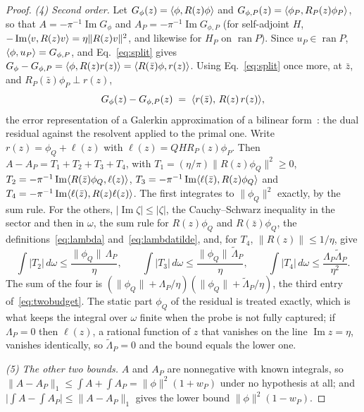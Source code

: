 \begin{proof}
\emph{(4) Second order.} Let $G_\phi(z)=\langle \phi,R(z)\phi \rangle$ and $G_{\phi,P}(z)=\langle \phi_P,R_P(z)\phi_P \rangle$,
so that $A=-\pi^{-1}\operatorname{Im}G_\phi$ and $A_P=-\pi^{-1}\operatorname{Im}G_{\phi,P}$ (for self-adjoint $H$,
$-\operatorname{Im}\langle v,R(z)v \rangle=\eta\lVert R(z)v\rVert^{2}$, and likewise for $H_P$ on $\operatorname{ran}P$).
Since $u_P\in\operatorname{ran}P$, $\langle \phi,u_P \rangle=G_{\phi,P}$, and Eq.~\eqref{eq:split} gives
$G_\phi-G_{\phi,P}=\langle \phi,R(z)r(z) \rangle=\langle R(\bar z)\phi,r(z) \rangle$. Using Eq.~\eqref{eq:split} once more, at
$\bar z$, and $R_P(\bar z)\phi_P\perp r(z)$,
\begin{equation}
G_\phi(z)-G_{\phi,P}(z)\;=\;\braket{r(\bar z),\,R(z)\,r(z)} ,
\label{eq:identity}
\end{equation}
the error representation of a Galerkin approximation of a bilinear form~\cite{strakos2011}: the dual residual
against the resolvent applied to the primal one. Write $r(z)=\phi_Q+\ell(z)$ with $\ell(z)=QHR_P(z)\phi_P$. Then
$A-A_P=T_1+T_2+T_3+T_4$, with $T_1=(\eta/\pi)\lVert R(z)\phi_Q\rVert^{2}\ge0$,
$T_2=-\pi^{-1}\operatorname{Im}\langle R(\bar z)\phi_Q,\ell(z) \rangle$,
$T_3=-\pi^{-1}\operatorname{Im}\langle \ell(\bar z),R(z)\phi_Q \rangle$ and
$T_4=-\pi^{-1}\operatorname{Im}\langle \ell(\bar z),R(z)\ell(z) \rangle$. The first integrates to
$\lVert\phi_Q\rVert^{2}$ exactly, by the sum rule. For the others, $|\operatorname{Im}\zeta|\le|\zeta|$, the
Cauchy--Schwarz inequality in the sector and then in $\omega$, the sum rule for $R(z)\phi_Q$ and
$R(\bar z)\phi_Q$, the definitions~\eqref{eq:lambda} and~\eqref{eq:lambdatilde}, and, for $T_4$,
$\lVert R(z)\rVert\le1/\eta$, give
\begin{equation*}
\int|T_2|\,d\omega\le\frac{\lVert\phi_Q\rVert\,\Lambda_P}{\eta},\qquad
\int|T_3|\,d\omega\le\frac{\lVert\phi_Q\rVert\,\tilde\Lambda_P}{\eta},\qquad
\int|T_4|\,d\omega\le\frac{\Lambda_P\tilde\Lambda_P}{\eta^{2}} .
\end{equation*}
The sum of the four is $(\lVert\phi_Q\rVert+\Lambda_P/\eta)(\lVert\phi_Q\rVert+\tilde\Lambda_P/\eta)$, the third entry
of~\eqref{eq:twobudget}. The static part $\phi_Q$ of the residual is treated exactly, which is what keeps the
integral over $\omega$ finite when the probe is not fully captured; if $\Lambda_P=0$ then $\ell(z)$, a rational
function of $z$ that vanishes on the line $\operatorname{Im}z=\eta$, vanishes identically, so
$\tilde\Lambda_P=0$ and the bound equals the lower one.

\emph{(5) The other two bounds.} $A$ and $A_P$ are nonnegative with known integrals, so
$\lVert A-A_P\rVert_1\le\int A+\int A_P=\lVert\phi\rVert^{2}(1+w_P)$ under no hypothesis at all; and
$\bigl|\int A-\int A_P\bigr|\le\lVert A-A_P\rVert_1$ gives the lower bound
$\lVert\phi\rVert^{2}(1-w_P)$.


\end{proof}
